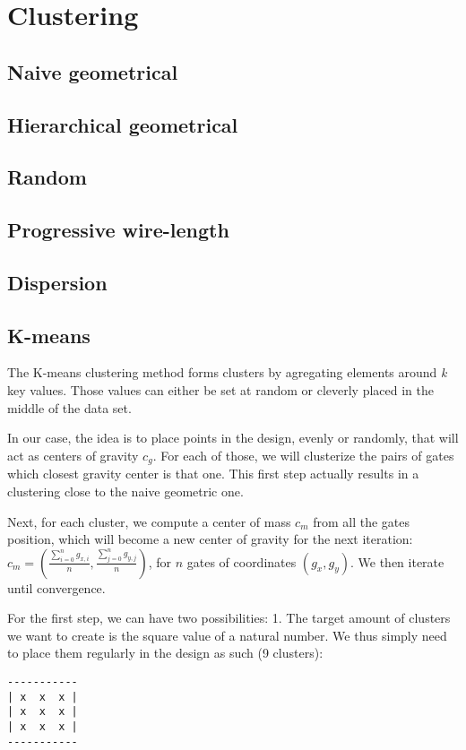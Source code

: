 \section{Clustering}

\subsection{Naive geometrical}

\subsection{Hierarchical geometrical}

\subsection{Random}

\subsection{Progressive wire-length}

\subsection{Dispersion}

\subsection{K-means}
The K-means clustering method forms clusters by agregating elements around \textit{k} key values.
Those values can either be set at random or cleverly placed in the middle of the data set.

In our case, the idea is to place points in the design, evenly or randomly, that will act as centers of gravity $c_g$.
For each of those, we will clusterize the pairs of gates which closest gravity center is that one.
This first step actually results in a clustering close to the naive geometric one.

Next, for each cluster, we compute a center of mass $c_m$ from all the gates position, which will become a new center of gravity for the next iteration: $c_m = \left( \frac{\sum_{i = 0}^{n} g_{x,i}}{n}, \frac{\sum_{j = 0}^{n} g_{y,j}}{n} \right)$, for $n$ gates of coordinates $(g_x, g_y)$.
We then iterate until convergence.

For the first step, we can have two possibilities:
1. The target amount of clusters we want to create is the square value of a natural number.
We thus simply need to place them regularly in the design as such (9 clusters):
\begin{verbatim}
-----------
| x  x  x |
| x  x  x |
| x  x  x |
-----------
\end{verbatim}

